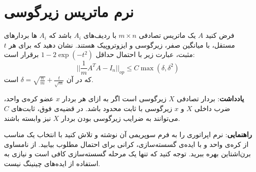 \section[]{ نرم ماتریس زیرگوسی}
فرض کنید $A$ یک ماتریس تصادفی
$m\times n$
با ردیف‌های 
$A_i$
باشد که $A_i$ ها بردارهای مستقل، با میانگین صفر، زیرگوسی و ایزوتروپیک هستند. نشان‌ دهید که برای هر $t$ مثبت، عبارت زیر با احتمال حداقل
$1 - 2 \exp(-t^2)$
برقرار است:
$$|| \frac{1}{m} A^TA - I_n||_{op} \leq C \max(\delta, \delta^2)$$
که در آن
$\delta = \sqrt{\frac{n}{m}} + \frac{t}{\sqrt{m}}$
است.

\vspace{0.5cm}

\textbf{یادداشت}:
بردار تصادفی $X$ زیرگوسی است اگر به ازای هر بردار $x$ عضو کره‌ی واحد، ضرب داخلی $X$ و $x$ زیرگوسی با ثابت محدود باشد. در قضیه‌ی فوق، ثابت‌های $C$ می‌توانند به ضرایب زیرگوسی بودن بردار $X$ نیز وابسته باشند.

\vspace{0.5cm}

\textbf{راهنمایی}:
نرم اپراتوری را به فرم سوپریمی آن نوشته و تلاش کنید با انتخاب یک 
مناسب از کره‌ی واحد و با ایده‌ی گسسته‌سازی، کرانی برای احتمال مطلوب بیابید. از نامساوی برن‌اشتاین بهره ببرید. توجه کنید که تنها یک مرحله گسسته‌سازی کافی است و نیازی به استفاده از ایده‌های چینینگ نیست.


